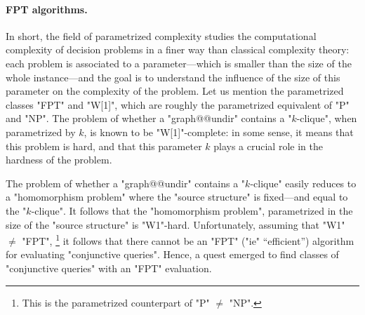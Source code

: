 \paragraph*{FPT algorithms.}
In short, the field of parametrized complexity
studies the computational complexity of decision problems
in a finer way than classical complexity theory: each problem
is associated to a parameter---which is smaller than the size of the whole instance---and
the goal is to understand the influence of the size of this parameter on the
complexity of the problem.
Let us mention the parametrized classes "FPT" and "W[1]", which are roughly
the parametrized equivalent of "P" and "NP".
The problem of whether a "graph@@undir" contains a "$k$-clique",
when parametrized by $k$, is known to be "W[1]"-complete:
in some sense, it means that this problem is hard, and that
this parameter $k$ plays a crucial role in the hardness of the problem.

The problem of whether a "graph@@undir" contains a "$k$-clique" easily reduces to a
"homomorphism problem" where the "source structure" is fixed---and equal to the "$k$-clique".
It follows that the "homomorphism problem", parametrized in the
size of the "source structure" is "W1"-hard. Unfortunately, assuming that "W1" $\neq$ "FPT",%
\footnote{This is the parametrized counterpart of "P" $\neq$ "NP".}
it follows that there cannot be an "FPT" ("ie" ``efficient'')
algorithm for evaluating "conjunctive queries".
Hence, a quest emerged to find classes of "conjunctive queries" with an "FPT" evaluation.

